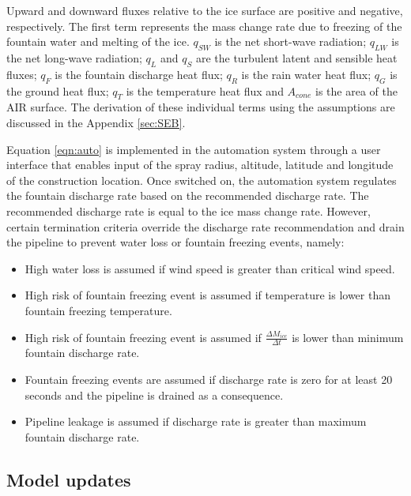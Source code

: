 \documentclass[tc, manuscript]{copernicus}
\begin{document}
Upward and downward fluxes relative to the ice surface are positive and negative, respectively. The first term
represents the mass change rate due to freezing of the fountain water and melting of the ice. $q_{SW}$ is the
net short-wave radiation; $q_{LW}$ is the net long-wave radiation; $q_{L}$ and $q_{S}$ are the turbulent latent
and sensible heat fluxes; $q_{F}$ is the fountain discharge heat flux; $q_{R}$ is the rain water heat
flux; $q_{G}$ is the ground heat flux; $q_{T}$ is the temperature heat flux and $A_{cone}$ is the area of the
AIR surface. The derivation of these individual terms using the assumptions are discussed in the Appendix
\ref{sec:SEB}.

Equation \ref{eqn:auto} is implemented in the automation system through a user interface that enables input of
the spray radius, altitude, latitude and longitude of the construction location. Once switched on, the
automation system regulates the fountain discharge rate based on the recommended discharge rate. The recommended
discharge rate is equal to the ice mass change rate. However, certain termination criteria override the
discharge rate recommendation and drain the pipeline to prevent water loss or fountain freezing events, namely: 

\begin{itemize}

\item High water loss is assumed if wind speed is greater than critical wind speed.

\item High risk of fountain freezing event is assumed if temperature is lower than fountain freezing temperature.

\item High risk of fountain freezing event is assumed if $\frac{\Delta M_{ice}}{\Delta t}$ is lower than minimum fountain discharge rate. 

\item Fountain freezing events are assumed if discharge rate is zero for at least 20 seconds and the pipeline is drained as a
  consequence.

\item Pipeline leakage is assumed if discharge rate is greater than maximum fountain discharge rate.

\end{itemize}

\subsection{Model updates}
\end{document}
